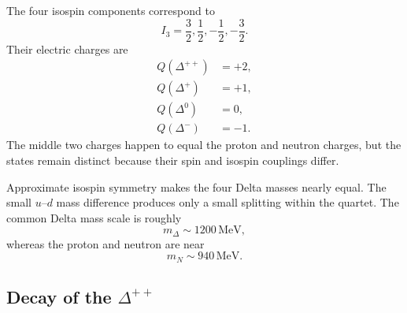 \begin{classroomqa}
\end{classroomqa}

\begin{classroomqa}
\end{classroomqa}

The four isospin components correspond to
\begin{equation}
I_3=\frac32,\frac12,-\frac12,-\frac32.
\end{equation}
Their electric charges are
\begin{align}
Q(\Delta^{++})&=+2,\\
Q(\Delta^{+})&=+1,\\
Q(\Delta^{0})&=0,\\
Q(\Delta^{-})&=-1.
\end{align}
The middle two charges happen to equal the proton and neutron charges, but the states remain distinct because their spin and isospin couplings differ.

Approximate isospin symmetry makes the four Delta masses nearly equal. The small \(u\)--\(d\) mass difference produces only a small splitting within the quartet. The common Delta mass scale is roughly
\begin{equation}
m_\Delta\sim1200\,\mathrm{MeV},
\end{equation}
whereas the proton and neutron are near
\begin{equation}
m_N\sim940\,\mathrm{MeV}.
\end{equation}

\subsection{Decay of the \texorpdfstring{\(\Delta^{++}\)}{Delta++}}

